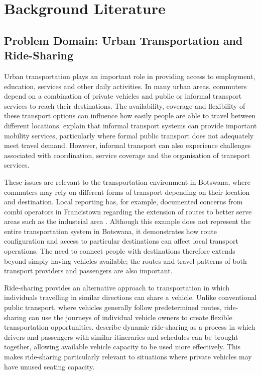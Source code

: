 \chapter{Background Literature}
\label{ch:background}

\section{Problem Domain: Urban Transportation and Ride-Sharing}
\label{sec:domain}

Urban transportation plays an important role in providing access to employment, education, services and other daily activities. In many urban areas, commuters depend on a combination of private vehicles and public or informal transport services to reach their destinations. The availability, coverage and flexibility of these transport options can influence how easily people are able to travel between different locations. \citet{cervero2007} explain that informal transport systems can provide important mobility services, particularly where formal public transport does not adequately meet travel demand. However, informal transport can also experience challenges associated with coordination, service coverage and the organisation of transport services.

These issues are relevant to the transportation environment in Botswana, where commuters may rely on different forms of transport depending on their location and destination. Local reporting has, for example, documented concerns from combi operators in Francistown regarding the extension of routes to better serve areas such as the industrial area \citep{kebareng2013}. Although this example does not represent the entire transportation system in Botswana, it demonstrates how route configuration and access to particular destinations can affect local transport operations. The need to connect people with destinations therefore extends beyond simply having vehicles available; the routes and travel patterns of both transport providers and passengers are also important.

Ride-sharing provides an alternative approach to transportation in which individuals travelling in similar directions can share a vehicle. Unlike conventional public transport, where vehicles generally follow predetermined routes, ride-sharing can use the journeys of individual vehicle owners to create flexible transportation opportunities. \citet{agatz2012} describe dynamic ride-sharing as a process in which drivers and passengers with similar itineraries and schedules can be brought together, allowing available vehicle capacity to be used more effectively. This makes ride-sharing particularly relevant to situations where private vehicles may have unused seating capacity.

